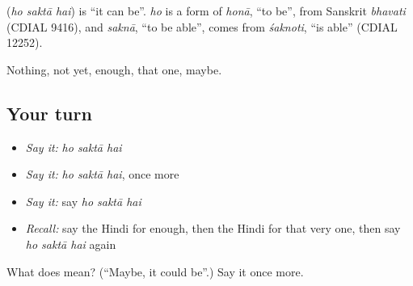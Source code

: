 \begin{cousinweb}
\textbf{  } (\emph{ho saktā hai}) is \textquotedblleft{}it can be\textquotedblright{}. \emph{ho} is a form of \emph{honā}, \textquotedblleft{}to be\textquotedblright{}, from Sanskrit \emph{bhavati} (CDIAL 9416), and \emph{saknā}, \textquotedblleft{}to be able\textquotedblright{}, comes from \emph{śaknoti}, \textquotedblleft{}is able\textquotedblright{} (CDIAL 12252).
\end{cousinweb}

\begin{grammarlens}[title={What you've built}]
Nothing, not yet, enough, that one, maybe.
\end{grammarlens}

\subsection*{Your turn}
\begin{itemize}
\raggedright
  \item \emph{Say it:} \emph{ho saktā hai}
  \item \emph{Say it:} \emph{ho saktā hai}, once more
  \item \emph{Say it:} say \emph{ho saktā hai}
  \item \emph{Recall:} say the Hindi for enough, then the Hindi for that very one, then say \emph{ho saktā hai} again
\end{itemize}

\begin{tcolorbox}[breakable,colback=teal!4,colframe=teal!35!black,title={Before you move on}]
What does    mean? (\textquotedblleft{}Maybe, it could be\textquotedblright{}.) Say it once more.
\end{tcolorbox}
